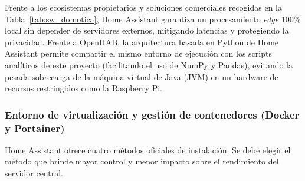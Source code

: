 Frente a los ecosistemas propietarios y soluciones comerciales recogidas en la Tabla~\ref{tab:sw_domotica}, Home Assistant garantiza un procesamiento \textit{edge} 100\% local sin depender de servidores externos, mitigando latencias y protegiendo la privacidad. Frente a OpenHAB, la arquitectura basada en Python de Home Assistant permite compartir el mismo entorno de ejecución con los scripts analíticos de este proyecto (facilitando el uso de NumPy y Pandas), evitando la pesada sobrecarga de la máquina virtual de Java (JVM) en un hardware de recursos restringidos como la Raspberry Pi.

\subsubsection{Entorno de virtualización y gestión de contenedores (Docker y Portainer)}
Home Assistant ofrece cuatro métodos oficiales de instalación. Se debe elegir el método que brinde mayor control y menor impacto sobre el rendimiento del servidor central.

